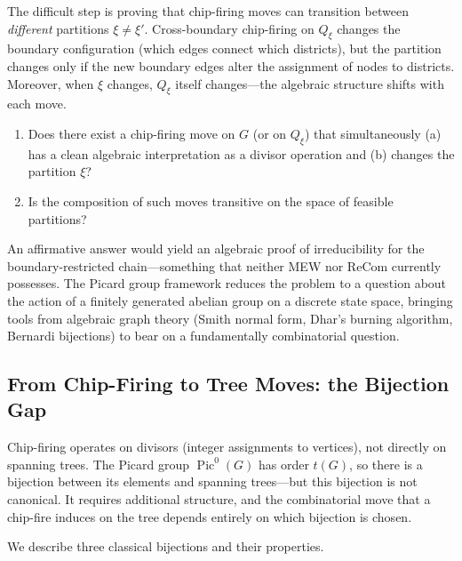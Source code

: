 \documentclass[11pt]{article}
\newcommand{\Pic}{\operatorname{Pic}^0}
\begin{document}
The difficult step is proving that chip-firing moves can transition between
\emph{different} partitions $\xi \neq \xi'$. Cross-boundary chip-firing on
$Q_{\xi}$ changes the boundary configuration (which edges connect which
districts), but the partition changes only if the new boundary edges alter the
assignment of nodes to districts. Moreover, when $\xi$ changes,
$Q_{\xi}$ itself changes---the algebraic structure shifts with each move.

\begin{enumerate}
  \item[Q1.] Does there exist a chip-firing move on $G$ (or on $Q_{\xi}$) that
    simultaneously (a) has a clean algebraic interpretation as a divisor
    operation and (b) changes the partition $\xi$?

  \item[Q2.] Is the composition of such moves transitive on the space of
    feasible partitions?
\end{enumerate}

An affirmative answer would yield an algebraic proof of irreducibility for the
boundary-restricted chain---something that neither MEW nor ReCom currently
possesses. The Picard group framework reduces the problem to a question about
the action of a finitely generated abelian group on a discrete state space,
bringing tools from algebraic graph theory (Smith normal form, Dhar's burning
algorithm, Bernardi bijections) to bear on a fundamentally combinatorial
question.

\subsection{From Chip-Firing to Tree Moves: the Bijection Gap}\label{sec:bijection-gap}

Chip-firing operates on divisors (integer assignments to vertices), not
directly on spanning trees. The Picard group $\Pic(G)$ has order $t(G)$, so
there is a bijection between its elements and spanning trees---but this
bijection is not canonical. It requires additional structure, and the
combinatorial move that a chip-fire induces on the tree depends entirely on
which bijection is chosen.

We describe three classical bijections and their properties.
\end{document}
